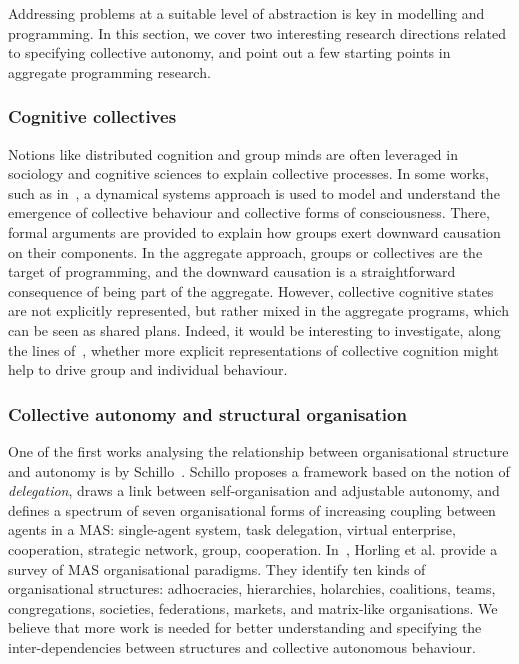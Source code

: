 Addressing problems at a suitable level of abstraction
 is key in modelling and programming.
%
In this section, we cover two interesting research directions 
 related to specifying collective autonomy,
 and point out a few starting points in aggregate programming research.

\subsubsection{Cognitive collectives}
%
Notions like distributed cognition 
 and group minds
 are often leveraged in sociology and cognitive sciences
 to explain collective processes.
%
In some works, such as in~\cite{DBLP:journals/mima/Palermos16},
 a dynamical systems approach is used
 to model and understand the emergence 
 of collective behaviour and collective forms of consciousness.
%
There, formal arguments are provided to 
 explain how groups exert downward causation 
 on their components.
%
In the aggregate approach,
 groups or collectives
 are the target of programming,
 and the downward causation 
 is a straightforward consequence 
 of being part of the aggregate.
%
However, collective cognitive states are not explicitly represented,
 but rather mixed in the aggregate programs, which can be seen as shared plans.
%
Indeed, it would be interesting to investigate,
 along the lines of~\cite{viroli2017ijaose-aggregate-plans},
 whether more explicit representations 
 of collective cognition
 might help to drive group and individual behaviour.


\subsubsection{Collective autonomy and structural organisation}

One of the first works analysing the relationship between organisational structure
 and autonomy 
 is by Schillo~\cite{DBLP:journals/connection/Schillo02}.
%
Schillo proposes a framework based on the notion of \emph{delegation},
draws a link between self-organisation and adjustable autonomy,
and defines a spectrum of seven organisational forms of increasing coupling between agents in a MAS: 
 single-agent system,
 task delegation,
 virtual enterprise,
 cooperation,
 strategic network,
 group,
 cooperation.
%
In~\cite{DBLP:journals/ker/HorlingL04},
 Horling et al. 
 provide a survey of MAS organisational paradigms.
%
They identify ten kinds of organisational structures:
 adhocracies, hierarchies, holarchies, coalitions, teams, congregations, societies, federations, markets, and matrix-like organisations.
%
We believe that more work is needed for better understanding and specifying the inter-dependencies between structures
 and collective autonomous behaviour.

